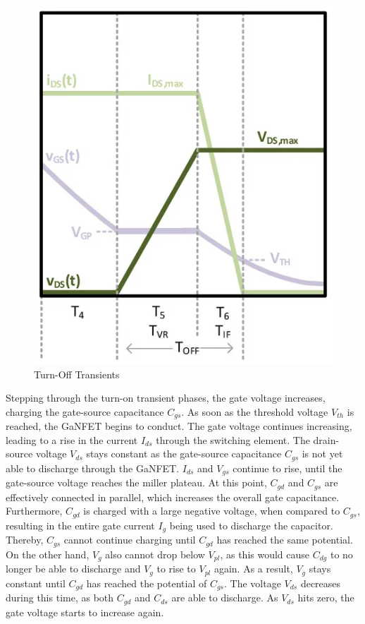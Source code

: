 \begin{figure}[H]
\begin{minipage}{0.5\textwidth}
        \includegraphics[width=0.7\linewidth]{Bilder/Kapitel2/MOSFET Transient turnoff.png}
        \caption{Turn-Off Transients}
        \label{fig:MOSFET_transient_turnoff}
    \end{minipage}\hfill
\end{figure}
Stepping through the turn-on transient phases, the gate voltage increases, charging the gate-source capacitance $C_{gs}$. As soon as the threshold voltage $V_{th}$ is reached, the \ac{GaNFET} begins to conduct. The gate voltage continues increasing, leading to a rise in the current $I_{ds}$ through the switching element. The drain-source voltage $V_{ds}$ stays constant as the gate-source capacitance $C_{gs}$ is not yet able to discharge through the \ac{GaNFET}. $I_{ds}$ and $V_{gs}$ continue to rise, until the gate-source voltage reaches the miller plateau. At this point, $C_{gd}$ and $C_{gs}$ are effectively connected in parallel, which increases the overall gate capacitance. Furthermore, $C_{gd}$ is charged with a large negative voltage, when compared to $C_{gs}$, resulting in the entire gate current $I_g$ being used to discharge the capacitor. Thereby, $C_{gs}$ cannot continue charging until $C_{gd}$ has reached the same potential. On the other hand, $V_g$ also cannot drop below $V_{pl}$, as this would cause $C_{dg}$ to no longer be able to discharge and $V_g$ to rise to $V_{pl}$ again. As a result, $V_g$ stays constant until $C_{gd}$ has reached the potential of $C_{gs}$. The voltage $V_{ds}$ decreases during this time, as both $C_{gd}$ and $C_{ds}$ are able to discharge. As $V_{ds}$ hits zero, the gate voltage starts to increase again.\\
